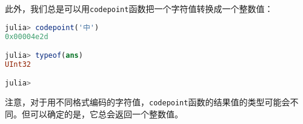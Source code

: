 此外，我们总是可以用\verb|codepoint|函数把一个字符值转换成一个整数值：
\begin{lstlisting}[language=julia]
julia> codepoint('中')
0x00004e2d

julia> typeof(ans)
UInt32

julia> 
\end{lstlisting}

注意，对于用不同格式编码的字符值，\verb|codepoint|函数的结果值的类型可能会不同。但可以确定的是，它总会返回一个整数值。
